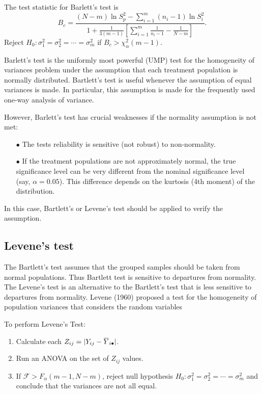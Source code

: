 \begin{definition}
    The test statistic for Barlett's test is 
    \begin{equation}
        B_c = \frac{(N -m) \ln S^2_p - \sum^m_{i=1} (n_i - 1) \ln S^2_i }{\displaystyle 1 + \frac{1}{3(m-1)} 
    \left[ \sum^m_{i=1} \frac{1}{n_i - 1} - \frac{1}{N - m} \right]}.
    \end{equation}
    Reject $H_0 : \sigma^2_1 = \sigma^2_2 = \cdots = \sigma^2_m$ if $B_c > \chi^2_\alpha(m-1)$.
\end{definition}

Barlett's test is the uniformly most powerful (UMP) test for the homogeneity of variances 
problem under the assumption that each treatment population is normally distributed.
Bartlett's test is useful whenever the assumption of equal variances is made. In particular, this assumption is made for the frequently used one-way analysis of variance.

However, Barlett's test has crucial weaknesses if the normality assumption is not met:
\begin{itemize}
    \item[$\bullet$] The tests reliability is sensitive (not robust) to non-normality.
    \item[$\bullet$]  If the treatment populations are not approximately normal, the true significance level can be
 very different from the nominal significance level (say, $ \alpha = 0.05$). This difference depends on the
 kurtosis (4th moment) of the distribution.
\end{itemize}

 In this case, Bartlett's or Levene's test should be applied to verify the assumption.

\subsection{Levene's test}

 The Bartlett's test assumes that the grouped samples should be taken from
 normal populations. Thus Bartlett test is sensitive to departures from
 normality. The Levene's test is an alternative to the Bartlett's test that is less
 sensitive to departures from normality. Levene (1960) proposed a test for the
 homogeneity of population variances that considers the random variables

\begin{definition}
    To perform Levene's Test:
    \begin{enumerate}
        \item Calculate each $Z_{ij} = |Y_{ij} - \ols{Y}_{i \bullet}|$.
        \item Run an ANOVA on the set of $Z_{ij}$ values.
        \item If $\mathcal{F} > F_{\alpha}(m - 1, N-m)$, reject null hypothesis 
        $H_0 : \sigma^2_1 = \sigma^2_2 = \cdots = \sigma^2_m$ and conclude that 
        the variances are not all equal.
    \end{enumerate}
\end{definition}

